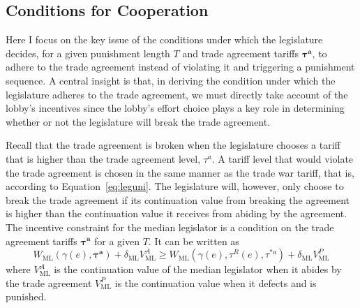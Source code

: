 \documentclass[authoryear, review]{elsarticle}
\newcommand{\bta}{\bm{\tau^a}}
\newcommand{\ga}{\gamma}
\newcommand{\de}{\delta}
\begin{document}
\subsection{Conditions for Cooperation}
\label{sec:coop}
Here I focus on the key issue of the conditions under which the legislature decides, for a given punishment length $T$ and trade agreement tariffs $\bta$, to adhere to the trade agreement instead of violating it and triggering a punishment sequence. A central insight is that, in deriving the condition under which the legislature adheres to the trade agreement, we must directly take account of the lobby's incentives since the lobby's effort choice plays a key role in determining whether or not the legislature will break the trade agreement. 

Recall that the trade agreement is broken when the legislature chooses a tariff that is higher than the trade agreement level, $\tau^a$. A tariff level that would violate the trade agreement is chosen in the same manner as the trade war tariff, that is, according to Equation~\ref{eq:leguni}. The legislature will, however, only choose to break the trade agreement if its continuation value from breaking the agreement is higher than the continuation value it receives from abiding by the agreement. The incentive constraint for the median legislator is a condition on the trade agreement tariffs $\bta$ for a given $T$. It can be written as
\[
  W_\text{ML}(\ga(e),\bta) + \de_\text{ML} V^A_\text{ML} \geq W_\text{ML}(\ga(e),\tau^R(e),\tau^{*a}) + \de_\text{ML} V^P_\text{ML}
\]
where $V^A_\text{ML}$ is the continuation value of the median legislator when it abides by the trade agreement $V^P_\text{ML}$ is the continuation value when it defects and is punished.
\end{document}
